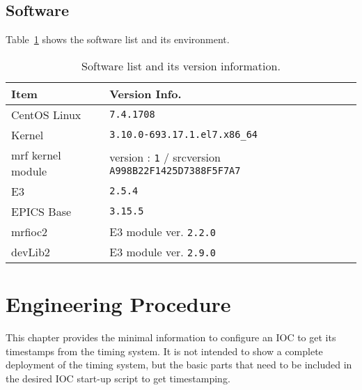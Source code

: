 \documentclass[11pt
  , a4paper
  , article
  , oneside
  , showtrims
]{memoir}
\begin{document}
\section{Software}
Table~\ref{table:swlist} shows the software list and its environment.
\begin{table}[!htb]
  \centering
  \begin{tabular}{l|l}
    \toprule
    Item               & Version Info.                                                      \\\midrule
    CentOS Linux       & \texttt{7.4.1708}                                                  \\\midrule
    Kernel             & \texttt{3.10.0-693.17.1.el7.x86\_64}                               \\\midrule
    mrf kernel module  & version : \texttt{1} / srcversion \texttt{A998B22F1425D7388F5F7A7} \\\midrule
    E3                 & \texttt{2.5.4}                                                     \\\midrule
    EPICS Base         & \texttt{3.15.5}                                                    \\\midrule
    mrfioc2            & E3 module ver. \texttt{2.2.0}                                      \\\midrule
    devLib2            & E3 module ver. \texttt{2.9.0}                                      \\\bottomrule
  \end{tabular}
  \caption[]{Software list and its version information.}
  \label{table:swlist}
\end{table}


\clearpage

\chapter{Engineering Procedure}
This chapter provides the minimal information to configure an IOC to get its timestamps from the timing system. It is not intended to show a complete deployment of the timing system, but the basic parts that need to be included in the desired IOC start-up script to get timestamping.
\end{document}
